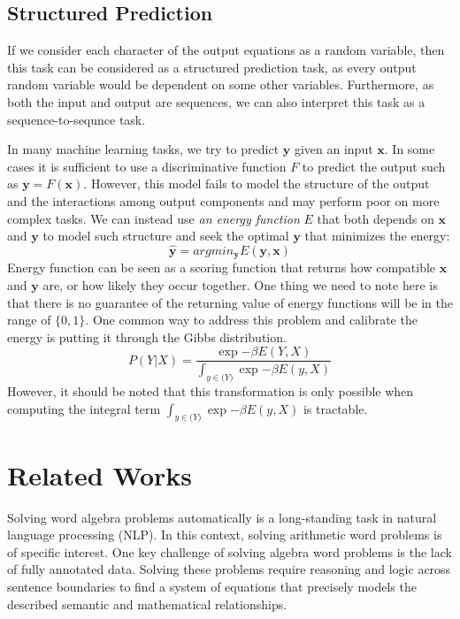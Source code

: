 \documentclass[11pt,letterpaper]{article}
\begin{document}
\subsection{Structured Prediction}
If we consider each character of the output equations as a random variable, then this task can be considered as a structured prediction task, as every output random variable would be dependent on some other variables. Furthermore, as both the input and output are sequences, we can also interpret this task as a sequence-to-sequnce task.

In many machine learning tasks, we try to predict $\textbf{y}$ given an input $\textbf{x}$. In some cases it is sufficient to use a discriminative function $F$ to predict the output such as $\textbf{y} = F( \textbf{x} )$. However, this model fails to model the structure of the output and the interactions among output components and may perform poor on more complex tasks. We can instead use \textit{an energy function} $E$ that both depends on $\textbf{x}$ and $\textbf{y}$ to model such structure and seek the optimal $\textbf{y}$ that minimizes the energy:
\begin{equation}
\hat{\mathbf{y}} = argmin_{\mathbf{y}} E( \mathbf{y}, \mathbf{x} )%
\label{ebm0}
\end{equation}
Energy function can be seen as a scoring function that returns how compatible $\mathbf{x}$ and $\mathbf{y}$ are, or how likely they occur together.
One thing we need to note here is that there is no guarantee of the returning value of energy functions will be in the range of $\{ 0, 1\}$. One common way to address this problem and calibrate the energy is putting it through the Gibbs distribution.
\begin{equation}
P(Y|X) = \frac{ \exp{- \beta E(Y, X)} }{\int_{y \in \mathcal(Y)} \exp{- \beta E(y, X)}  }
\label{ebm1}
\end{equation}
However, it should be noted that this transformation is only possible when computing the integral term $\int_{y \in \mathcal(Y)} \exp{- \beta E(y, X)}$ is tractable.
\section{Related Works}
Solving word algebra problems automatically is a long-standing task in natural language processing (NLP). In this context, solving arithmetic word problems is of specific interest. One key challenge of solving algebra word problems is the lack of fully annotated data. Solving these problems require reasoning and logic across sentence boundaries to find a system of equations that precisely models the described semantic and mathematical relationships.
\end{document}
